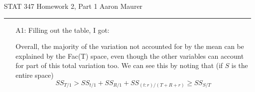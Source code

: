 \documentclass[11pt]{article}
\theoremstyle{definition}
\begin{document}

STAT 347 Homework 2, Part 1 \hfill Aaron Maurer
\vspace{2mm}
\hrule
\vspace{2mm}
\begin{itemize}
    \item[A1:]
        Filling out the table, I got:
        \FloatBarrier
        
        \FloatBarrier
        Overall, the majority of the variation not accounted for by the mean can be explained by the Fac(T) space, even though the other variables can account for part of this total variation too. We can see this by noting that (if $S$ is the entire space)
        \[ SS_{T/1} > SS_{t/1} + SS_{R/1}+ SS_{(t:r)/(T+R+r)} \geq SS_{S/T} \]


\end{itemize}
\end{document}
